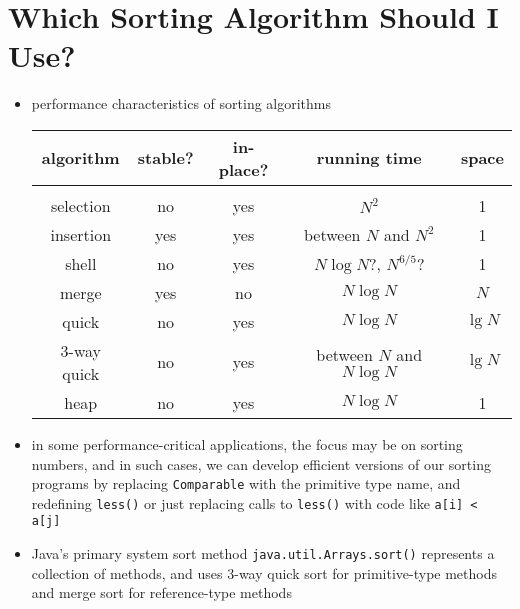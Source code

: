 \documentclass[8pt,a4paper,compress]{beamer}
\begin{document}
\section{Which Sorting Algorithm Should I Use?}
\begin{frame}[fragile]
\begin{itemize}
\item performance characteristics of sorting algorithms
\begin{center}
\begin{tabular}{ccccc}
\textbf{algorithm} & \textbf{stable?} & \textbf{in-place?} & \textbf{running time} & \textbf{space} \\ \hline \\
selection & no & yes & $N^2$ & 1 \\
insertion & yes & yes & between $N$ and $N^2$ & 1 \\
shell & no & yes & $N\log N$?, $N^{6/5}$? & 1 \\
merge & yes & no & $N\log N$ & $N$ \\
quick & no & yes & $N\log N$ & $\lg N$ \\
3-way quick & no & yes & between $N$ and $N\log N$ & $\lg N$ \\
heap & no & yes & $N\log N$ & 1
\end{tabular} 
\end{center}

\item in some performance-critical applications, the focus may be on sorting numbers, and in such cases, we can develop efficient versions of our sorting programs by replacing \lstinline$Comparable$ with the primitive type name, and redefining \lstinline$less()$ or just replacing calls to \lstinline$less()$ with code like \lstinline$a[i] < a[j]$

\item Java's primary system sort method  \lstinline$java.util.Arrays.sort()$ represents a collection of methods, and uses 3-way quick sort for primitive-type methods and merge sort for reference-type methods
\end{itemize}
\end{frame}
\end{document}
